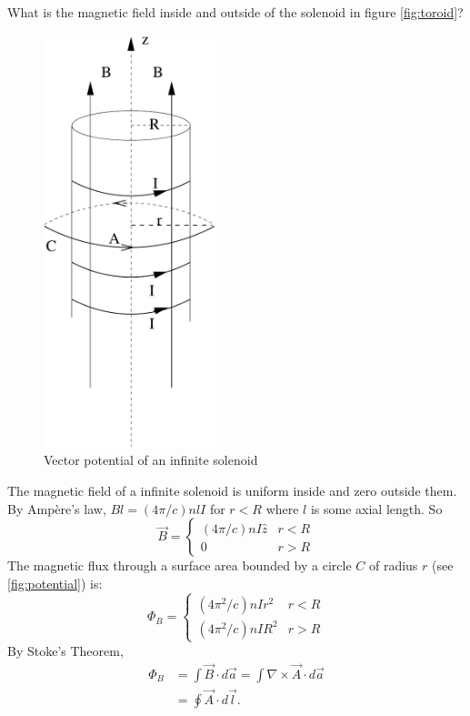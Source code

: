 \documentclass[makesolutionspdf]{esg8022pset}
\begin{document}
\begin{solution}
  What is the magnetic field inside and outside of the solenoid in figure \autoref{fig:toroid}?
  \begin{figure}[H]
    \centering
    \includegraphics[width = 5cm]{vecpot7}  
    \caption{Vector potential of an infinite solenoid}
    \label{fig:potential}
  \end{figure}
  The magnetic field of a infinite solenoid is uniform inside and zero outside
  them.  By Amp\`{e}re's law, $Bl=(4\pi/c)nlI$ for $r<R$ where $l$ is some axial
  length.  So
  \begin{equation}
    \vec{B}= \begin{cases} (4\pi/c)nI\hat{z} & r<R\\0 & r>R \end{cases}
  \end{equation}
  The  magnetic flux through a surface area bounded by a circle $C$ of radius
  $r$ (see \autoref{fig:potential}) is:
  \begin{equation}
    \Phi_B = \begin{cases} (4\pi^2/c)nIr^2 & r<R\\ (4\pi^2/c)nIR^2 & r>R \end{cases}
  \end{equation}
  By Stoke's Theorem,
  \begin{align*}
    \Phi_B & = \int \vec{B}\cdot d\vec{a}=\int \nabla\times\vec{A}\cdot d\vec{a}\\
           & = \oint \vec{A}\cdot d\vec{l}.
  \end{align*}


\end{solution}
\end{document}
